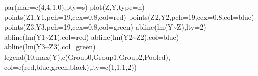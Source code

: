 \documentclass[
]{book}
\newenvironment{Shaded}{\begin{snugshade}}{\end{snugshade}}
\newcommand{\AttributeTok}[1]{\textcolor[rgb]{0.77,0.63,0.00}{#1}}
\newcommand{\DecValTok}[1]{\textcolor[rgb]{0.00,0.00,0.81}{#1}}
\newcommand{\FloatTok}[1]{\textcolor[rgb]{0.00,0.00,0.81}{#1}}
\newcommand{\FunctionTok}[1]{\textcolor[rgb]{0.00,0.00,0.00}{#1}}
\newcommand{\NormalTok}[1]{#1}
\newcommand{\SpecialCharTok}[1]{\textcolor[rgb]{0.00,0.00,0.00}{#1}}
\newcommand{\StringTok}[1]{\textcolor[rgb]{0.31,0.60,0.02}{#1}}
\begin{document}
\begin{Shaded}
\begin{Highlighting}[]
\FunctionTok{par}\NormalTok{(}\AttributeTok{mar=}\FunctionTok{c}\NormalTok{(}\DecValTok{4}\NormalTok{,}\DecValTok{4}\NormalTok{,}\DecValTok{1}\NormalTok{,}\DecValTok{0}\NormalTok{),}\AttributeTok{pty=}\StringTok{\textquotesingle{}s\textquotesingle{}}\NormalTok{) }
\FunctionTok{plot}\NormalTok{(Z,Y,}\AttributeTok{type=}\StringTok{\textquotesingle{}n\textquotesingle{}}\NormalTok{) }
\FunctionTok{points}\NormalTok{(Z1,Y1,}\AttributeTok{pch=}\DecValTok{19}\NormalTok{,}\AttributeTok{cex=}\FloatTok{0.8}\NormalTok{,}\AttributeTok{col=}\StringTok{\textquotesingle{}red\textquotesingle{}}\NormalTok{)}
\FunctionTok{points}\NormalTok{(Z2,Y2,}\AttributeTok{pch=}\DecValTok{19}\NormalTok{,}\AttributeTok{cex=}\FloatTok{0.8}\NormalTok{,}\AttributeTok{col=}\StringTok{\textquotesingle{}blue\textquotesingle{}}\NormalTok{) }
\FunctionTok{points}\NormalTok{(Z3,Y3,}\AttributeTok{pch=}\DecValTok{19}\NormalTok{,}\AttributeTok{cex=}\FloatTok{0.8}\NormalTok{,}\AttributeTok{col=}\StringTok{\textquotesingle{}green\textquotesingle{}}\NormalTok{) }
\FunctionTok{abline}\NormalTok{(}\FunctionTok{lm}\NormalTok{(Y}\SpecialCharTok{\textasciitilde{}}\NormalTok{Z),}\AttributeTok{lty=}\DecValTok{2}\NormalTok{) }
\FunctionTok{abline}\NormalTok{(}\FunctionTok{lm}\NormalTok{(Y1}\SpecialCharTok{\textasciitilde{}}\NormalTok{Z1),}\AttributeTok{col=}\StringTok{\textquotesingle{}red\textquotesingle{}}\NormalTok{) }
\FunctionTok{abline}\NormalTok{(}\FunctionTok{lm}\NormalTok{(Y2}\SpecialCharTok{\textasciitilde{}}\NormalTok{Z2),}\AttributeTok{col=}\StringTok{\textquotesingle{}blue\textquotesingle{}}\NormalTok{) }
\FunctionTok{abline}\NormalTok{(}\FunctionTok{lm}\NormalTok{(Y3}\SpecialCharTok{\textasciitilde{}}\NormalTok{Z3),}\AttributeTok{col=}\StringTok{\textquotesingle{}green\textquotesingle{}}\NormalTok{) }
\FunctionTok{legend}\NormalTok{(}\DecValTok{10}\NormalTok{,}\FunctionTok{max}\NormalTok{(Y),}\FunctionTok{c}\NormalTok{(}\StringTok{\textquotesingle{}Group0\textquotesingle{}}\NormalTok{,}\StringTok{\textquotesingle{}Group1\textquotesingle{}}\NormalTok{,}\StringTok{\textquotesingle{}Group2\textquotesingle{}}\NormalTok{,}\StringTok{\textquotesingle{}Pooled\textquotesingle{}}\NormalTok{), }\AttributeTok{col=}\FunctionTok{c}\NormalTok{(}\StringTok{\textquotesingle{}red\textquotesingle{}}\NormalTok{,}\StringTok{\textquotesingle{}blue\textquotesingle{}}\NormalTok{,}\StringTok{\textquotesingle{}green\textquotesingle{}}\NormalTok{,}\StringTok{\textquotesingle{}black\textquotesingle{}}\NormalTok{),}\AttributeTok{lty=}\FunctionTok{c}\NormalTok{(}\DecValTok{1}\NormalTok{,}\DecValTok{1}\NormalTok{,}\DecValTok{1}\NormalTok{,}\DecValTok{2}\NormalTok{))}
\end{Highlighting}
\end{Shaded}
\end{document}
